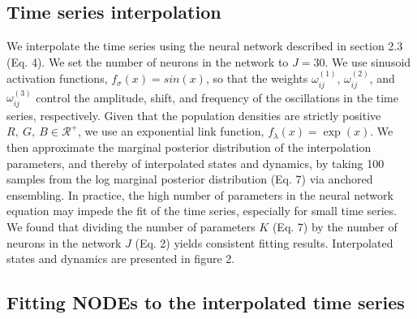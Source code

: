 \documentclass[11pt, oneside]{article}
\begin{document}
\subsection{Time series interpolation}

We interpolate the time series using the neural network described in section 2.3 (Eq. 4).
We set the number of neurons in the network to $J=30$.
We use sinusoid activation functions, $f_\sigma(x) = sin(x)$, so that the weights $\omega^{(1)}_{ij}$, $\omega^{(2)}_{ij}$, and $\omega^{(3)}_{ij}$ control the amplitude, shift, and frequency of the oscillations in the time series, respectively.
Given that the population densities are strictly positive $R,~G,~B \in \mathcal{R^{+}}$, we use an exponential link function, $f_\lambda(x) = \exp (x)$. 
We then approximate the marginal posterior distribution of the interpolation parameters, and thereby of interpolated states and dynamics, by taking 100 samples from the log marginal posterior distribution (Eq. 7) via anchored ensembling. %
In practice, the high number of parameters in the neural network equation may impede the fit of the time series, especially for small time series. 
We found that dividing the number of parameters $K$ (Eq. 7) by the number of neurons in the network $J$ (Eq. 2) yields consistent fitting results.
Interpolated states and dynamics are presented in figure 2.

\subsection{Fitting NODEs to the interpolated time series}
\end{document}
